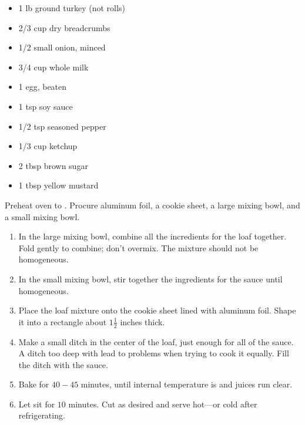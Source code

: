 
\RequirePackage{../recipe}






\thispagestyle{firstpage}

\ingredients
\begin{multicols}{2}
\begin{itemize}
    \item 1 lb ground turkey (not rolls)
    \item 2/3 cup dry breadcrumbs
    \item 1/2 small onion, minced
    \item 3/4 cup whole milk
    \item 1 egg, beaten
    \item 1 tsp soy sauce
    \item 1/2 tsp seasoned pepper
\end{itemize}
\columnbreak
{}
\begin{itemize}
    \item 1/3 cup ketchup
    \item 2 tbsp brown sugar
    \item 1 tbsp yellow mustard
\end{itemize}
\end{multicols}

\instructions
Preheat oven to . Procure aluminum foil, a cookie sheet, a large mixing bowl, and a small mixing bowl.
\begin{enumerate}
    \item In the large mixing bowl, combine all the incredients for the loaf together. Fold gently to combine; don't overmix. The mixture should not be homogeneous.
    \item In the small mixing bowl, stir together the ingredients for the sauce until homogeneous.
    \item Place the loaf mixture onto the cookie sheet lined with aluminum foil. Shape it into a rectangle about $1\frac{1}{2}$ inches thick.
    \item Make a small ditch in the center of the loaf, just enough for all of the sauce. A ditch too deep with lead to problems when trying to cook it equally. Fill the ditch with the sauce.
    \item Bake for $40-45$ minutes, until internal temperature is  and juices run clear.
    \item Let sit for $10$ minutes. Cut as desired and serve hot---or cold after refrigerating.
\end{enumerate}


